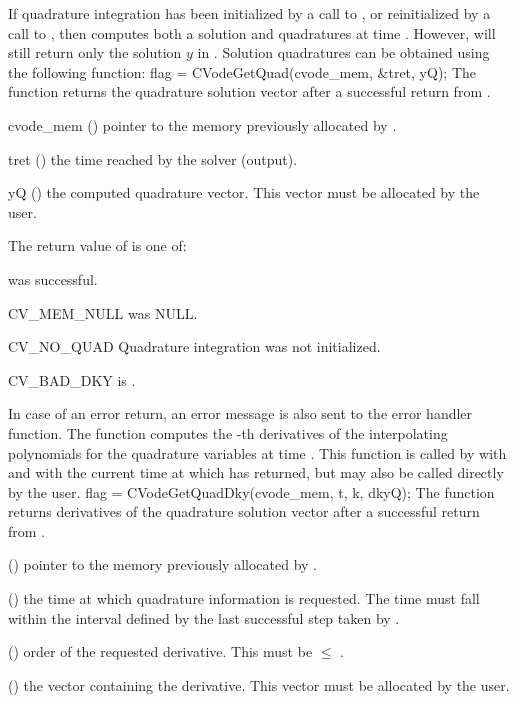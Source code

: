 If quadrature integration has been initialized by a call to ,
or reinitialized by a call to , then {\cvodes} computes both a solution
and quadratures at time . However,  will still return only the solution
$y$ in . Solution quadratures can be obtained using the following function:
{
  flag = CVodeGetQuad(cvode\_mem, \&tret, yQ);
}
{
  The function  returns the quadrature solution vector after a
  successful return from .
}
{
  \begin{args}
  \item[cvode\_mem] ()
    pointer to the memory previously allocated by .
  \item[tret] ()
    the time reached by the solver (output).
  \item[yQ] ()
    the computed quadrature vector. This vector must be allocated by the user.
  \end{args}
}
{
  The return value  of  is one of:
  \begin{args}
  \item[\Id{CV\_SUCCESS}]
     was successful.
  \item[CV\_MEM\_NULL]
     was NULL.
  \item[CV\_NO\_QUAD]
    Quadrature integration was not initialized.
  \item[CV\_BAD\_DKY]
     is .
  \end{args}
}
{
  In case of an error return, an error message is also sent to the error handler
  function.
}
The function  computes the -th derivatives of the interpolating
polynomials for the quadrature variables at time .
This function is called by  with  and with the current time
at which  has returned, but may also be called
directly by the user.
{
  flag = CVodeGetQuadDky(cvode\_mem, t, k, dkyQ);
}
{
  The function  returns derivatives of the quadrature solution
  vector after a successful return from .
}
{
  \begin{args}
  \item[\id{cvode\_mem}] ()
    pointer to the memory previously allocated by .
  \item[\id{t}] ()
    the time at which quadrature information is
    requested. The time  must fall within the interval defined by the last
    successful step taken by {\cvodes}.
  \item[\id{k}] () order of the requested derivative.  This
    must be $\leq$ .
  \item[\id{dkyQ}] ()
    the vector containing the derivative. This vector must be allocated by the user.
  \end{args}
}

